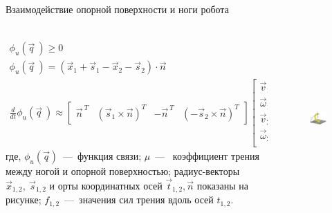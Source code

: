\documentclass[aspectratio=169,xcolor=table,10pt]{beamer}
\begin{document}
\begin{frame}[t]{Взаимодействие опорной поверхности и ноги робота}
    \framesubtitle{}
    \begin{columns}[T,onlytextwidth]
        \begin{column}{0.69\textwidth}
            \begin{align}
                \phi_u(\vec{q}\ ) \geqslant 0                                                     \\
                \phi_u(\vec{q}\ ) = (\vec{x}_1 + \vec{s}_1 - \vec{x}_2 - \vec{s}_2) \cdot \vec{n} \\
                \frac{d }{d t}\phi_u(\vec{q}\ ) \approx \begin{bmatrix}
                                                            \vec{n}^{\ T} & (\vec{s}_1 \times \vec{n})^T & -\vec{n}^{\ T} & (-\vec{s}_2 \times \vec{n})^T
                                                        \end{bmatrix} \begin{bmatrix}
                                                                          \vec{v}_1      \\
                                                                          \vec{\omega}_1 \\
                                                                          \vec{v}_2      \\
                                                                          \vec{\omega}_2 \\
                                                                      \end{bmatrix}
            \end{align}
            где, $\phi_u(\vec{q})$~---~функция связи; $ \mu $~---~ коэффициент трения между ногой и опорной поверхностью;  радиус-векторы $\vec{x}_{1,2},\ \vec{s}_{1,2}$ и орты координатных осей $\vec{t}_{1,2}, \vec{n}$ показаны на рисунке; $ f_{1,2} $~---~значения сил трения вдоль осей $t_{1,2}$.
        \end{column}
        \begin{column}{0.29\textwidth}
            \vspace{-0.4cm}
            \begin{figure}[H]
                \centering\includegraphics[height=6cm,width=1\textwidth,keepaspectratio]{contact_interaction.png}

\end{figure}
\end{column}
\end{columns}
\end{frame}
\end{document}
